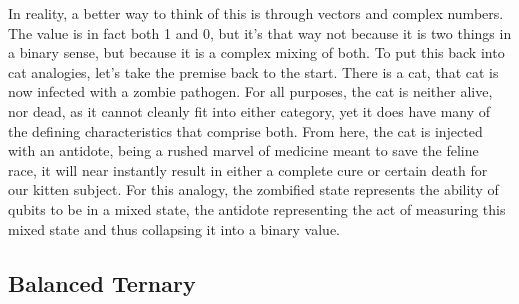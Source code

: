 \documentclass[a4paper]{article}
\begin{document}
 \newline
In reality, a better way to think of this is through vectors and complex numbers.  The value is in fact both 1 and 0, but it's that way not because it is two things in a binary sense, but because it is a complex mixing of both.  To put this back into cat analogies, let's take the premise back to the start.  There is a cat, that cat is now infected with a zombie pathogen.  For all purposes, the cat is neither alive, nor dead, as it cannot cleanly fit into either category, yet it does have many of the defining characteristics that comprise both.  From here, the cat is injected with an antidote,  being a rushed marvel of medicine meant to save the feline race, it will near instantly result in either a complete cure or certain death for our kitten subject.  For this analogy, the zombified state represents the ability of qubits to be in a mixed state, the antidote representing the act of measuring this mixed state and thus collapsing it into a binary value. %


\subsection{Balanced Ternary} %
\end{document}
